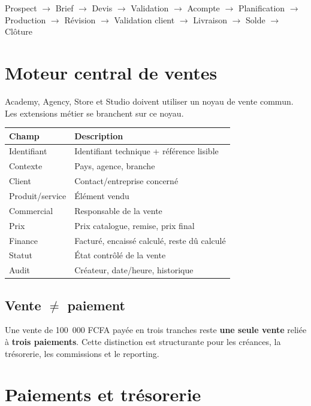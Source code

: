 \documentclass[11pt,a4paper]{article}
\newcommand{\tableheader}[2]{\textbf{#1} & \textbf{#2} \\ \hline}
\begin{document}
Prospect $\rightarrow$ Brief $\rightarrow$ Devis $\rightarrow$ Validation $\rightarrow$ Acompte $\rightarrow$ Planification $\rightarrow$ Production $\rightarrow$ Révision $\rightarrow$ Validation client $\rightarrow$ Livraison $\rightarrow$ Solde $\rightarrow$ Clôture

\section{Moteur central de ventes}

Academy, Agency, Store et Studio doivent utiliser un noyau de vente commun. Les extensions métier se branchent sur ce noyau.

\begin{tabularx}{\textwidth}{|l|X|}
\hline
\tableheader{Champ}{Description}
Identifiant & Identifiant technique + référence lisible \\ \hline
Contexte & Pays, agence, branche \\ \hline
Client & Contact/entreprise concerné \\ \hline
Produit/service & Élément vendu \\ \hline
Commercial & Responsable de la vente \\ \hline
Prix & Prix catalogue, remise, prix final \\ \hline
Finance & Facturé, encaissé calculé, reste dû calculé \\ \hline
Statut & État contrôlé de la vente \\ \hline
Audit & Créateur, date/heure, historique \\ \hline
\end{tabularx}

\subsection{Vente \texorpdfstring{$\neq$}{!=} paiement}

Une vente de 100~000 FCFA payée en trois tranches reste \textbf{une seule vente} reliée à \textbf{trois paiements}. Cette distinction est structurante pour les créances, la trésorerie, les commissions et le reporting.

\section{Paiements et trésorerie}
\end{document}
